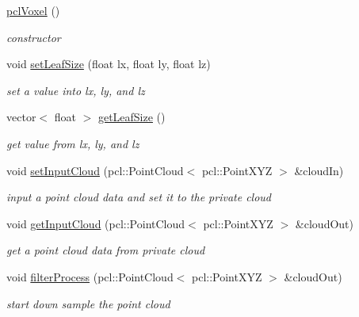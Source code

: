 \begin{DoxyCompactItemize}
\item 
\hyperlink{classpclVoxel_a77c4be41d81590d53266dbfe9b39eb70}{pcl\+Voxel} ()\hypertarget{classpclVoxel_a77c4be41d81590d53266dbfe9b39eb70}{}\label{classpclVoxel_a77c4be41d81590d53266dbfe9b39eb70}

\begin{DoxyCompactList}\small\item\em constructor \end{DoxyCompactList}\item 
void \hyperlink{classpclVoxel_a76f7815ad0e25aa4bda048474d9b4c21}{set\+Leaf\+Size} (float lx, float ly, float lz)
\begin{DoxyCompactList}\small\item\em set a value into lx, ly, and lz \end{DoxyCompactList}\item 
vector$<$ float $>$ \hyperlink{classpclVoxel_a95f14920a2338c81f35b7c787e30255e}{get\+Leaf\+Size} ()
\begin{DoxyCompactList}\small\item\em get value from lx, ly, and lz \end{DoxyCompactList}\item 
void \hyperlink{classpclVoxel_aed41ac156f4006ebfa0ffb98ad074461}{set\+Input\+Cloud} (pcl\+::\+Point\+Cloud$<$ pcl\+::\+Point\+X\+YZ $>$ \&cloud\+In)
\begin{DoxyCompactList}\small\item\em input a point cloud data and set it to the private cloud \end{DoxyCompactList}\item 
void \hyperlink{classpclVoxel_a0afe52b2fcb7cfddbe917e07c8f24bb4}{get\+Input\+Cloud} (pcl\+::\+Point\+Cloud$<$ pcl\+::\+Point\+X\+YZ $>$ \&cloud\+Out)
\begin{DoxyCompactList}\small\item\em get a point cloud data from private cloud \end{DoxyCompactList}\item 
void \hyperlink{classpclVoxel_a57b5711e07d1cfb307b8d72766aef447}{filter\+Process} (pcl\+::\+Point\+Cloud$<$ pcl\+::\+Point\+X\+YZ $>$ \&cloud\+Out)
\begin{DoxyCompactList}\small\item\em start down sample the point cloud \end{DoxyCompactList}\end{DoxyCompactItemize}


